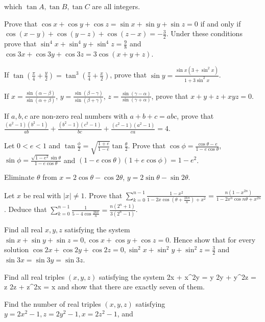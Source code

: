   which $\tan A, \tan B, \tan C$ are all integers.
\item Prove that $\cos x + \cos y + \cos z = \sin x + \sin y + \sin z = 0$ if and only if $\cos(x - y) + \cos(y
  - z) + \cos(z - x) = -\frac{3}{2}$. Under these conditions prove that $\sin^4x + \sin^4y + \sin^4z
  = \frac{9}{8}$ and $\cos3x + \cos3y + \cos3z = 3\cos(x + y + z)$.
\item If $\tan\left(\frac{\pi}{4} + \frac{y}{2}\right) = \tan^3\left(\frac{\pi}{4} + \frac{x}{2}\right)$, prove
  that $\sin y = \frac{\sin x\left(3 + \sin^2x\right)}{1 + 3\sin^2x}$.
\item If $x = \frac{\sin(\alpha - \beta)}{\sin(\alpha + \beta)}$, $y = \frac{\sin(\beta - \gamma)}{\sin(\beta
  + \gamma)}$, $z = \frac{\sin(\gamma - \alpha)}{\sin(\gamma + \alpha)}$, prove that $x + y + z + xyz = 0$.
\item If $a, b, c$ are non-zero real numbers with $a + b + c = abc$, prove that $\frac{(a^2 - 1)(b^2 - 1)}{ab}
  + \frac{(b^2 - 1)(c^2 - 1)}{bc} + \frac{(c^2 - 1)(a^2 - 1)}{ca} = 4$.
\item Let $0 < e < 1$ and $\tan\frac{\phi}{2} = \sqrt{\frac{1 + e}{1 - e}}\tan\frac{\theta}{2}$. Prove that
  $\cos\phi = \frac{\cos\theta - e}{1 - e\cos\theta}$, $\sin\phi = \frac{\sqrt{1 - e^2}\sin\theta}{1 -
    e\cos\theta}$ and $(1 - e\cos\theta)(1 + e\cos\phi) = 1 - e^2$.
\item Eliminate $\theta$ from $x = 2\cos\theta - \cos2\theta$, $y = 2\sin\theta - \sin2\theta$.
\item Let $x$ be real with $|x|\neq 1$. Prove that $\displaystyle\sum_{k = 0}^{n - 1}\frac{1 - x^2}{1 -
    2x\cos\left(\theta + \frac{2k\pi}{n}\right) + x^2} = \frac{n\left(1 - x^{2n}\right)}{1 - 2x^n\cos n\theta
    + x^{2n}}$. Deduce that $\displaystyle\sum_{k = 0}^{n - 1}\frac{1}{5 - 4\cos\frac{2k\pi}{n}} = \frac{n(2^n
    + 1)}{3(2^n - 1)}$.
\item Find all real $x, y, z$ satisfying the system $\sin x + \sin y + \sin z = 0, \cos x + \cos y + \cos z = 0$.
  Hence show that for every solution $\cos2x + \cos2y + \cos2z = 0, \sin^2x + \sin^2y + \sin^2z = \frac{3}{2}$
  and $\sin3x = \sin3y = \sin3z$.
\item Find all real triples $(x, y, z)$ satisfying the system
  \startformula\startalign
    \NC 2x + x^2y \NC = y\NR
    \NC 2y + y^2z \NC = z\NR
    \NC 2z + z^2x \NC = x\NR
  \stopalign\stopformula
  and show that there are exactly seven of them.
\item Find the number of real triples $(x, y, z)$ satisfying $y = 2x^2 - 1, z = 2y^2 - 1, x = 2z^2 - 1$, and
